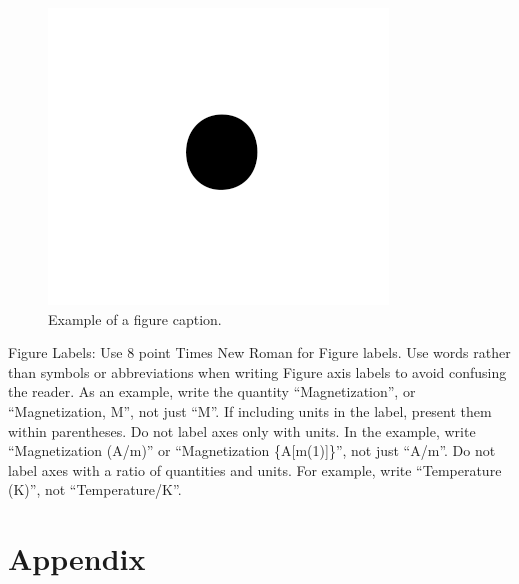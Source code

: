 \documentclass[conference]{IEEEtran}
\begin{document}
\begin{figure}[htbp]
\centerline{\includegraphics{assets/fig1.png}}
\caption{Example of a figure caption.}
\label{fig}
\end{figure}

Figure Labels: Use 8 point Times New Roman for Figure labels. Use words 
rather than symbols or abbreviations when writing Figure axis labels to 
avoid confusing the reader. As an example, write the quantity 
``Magnetization'', or ``Magnetization, M'', not just ``M''. If including 
units in the label, present them within parentheses. Do not label axes only 
with units. In the example, write ``Magnetization (A/m)'' or ``Magnetization 
\{A[m(1)]\}'', not just ``A/m''. Do not label axes with a ratio of 
quantities and units. For example, write ``Temperature (K)'', not 
``Temperature/K''.

\color{black}




\vspace{12pt}

\onecolumn
\appendix
\section{Appendix}

\tikzset{
    const plot,
}
\end{document}
